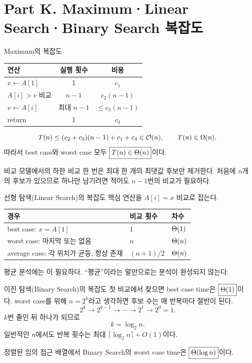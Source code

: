 \section{Part K. Maximum·Linear Search·Binary Search 복잡도}

\begin{frame}{Maximum의 복잡도}
  \renewcommand{\arraystretch}{.92}
  \begin{tabular}{@{}lcc@{}}
    \toprule
    연산 & 실행 횟수 & 비용 \\
    \midrule
    $v\gets A[1]$ & 1 & $c_1$ \\
    $A[i]>v$ 비교 & $n-1$ & $c_2(n-1)$ \\
    $v\gets A[i]$ & 최대 $n-1$ & $\le c_3(n-1)$ \\
    return & 1 & $c_4$ \\
    \bottomrule
  \end{tabular}
  \[
    T(n)\le(c_2+c_3)(n-1)+c_1+c_4\in\mathcal{O}(n),
    \qquad T(n)\in\Omega(n).
  \]
  따라서 best case와 worst case 모두 $\boxed{T(n)\in\Theta(n)}$이다.
  \begin{block}{비교 모델에서의 하한}
    비교 한 번은 최대 한 개의 최댓값 후보만 제거한다. 처음에 $n$개의 후보가 있으므로
    하나만 남기려면 적어도 $n-1$번의 비교가 필요하다.
  \end{block}
\end{frame}

\begin{frame}{선형 탐색(Linear Search)의 복잡도}
  핵심 연산을 $A[i]=x$ 비교로 잡는다.
  \begin{tabular}{@{}lll@{}}
    \toprule
    경우 & 비교 횟수 & 차수 \\
    \midrule
    best case: $x=A[1]$ & 1 & $\Theta(1)$ \\
    worst case: 마지막 또는 없음 & $n$ & $\Theta(n)$ \\
    average case: 각 위치가 균등, 항상 존재 & $(n+1)/2$ & $\Theta(n)$ \\
    \bottomrule
  \end{tabular}
  \vfill
  평균 분석에는 이 필요하다. ``평균''이라는 말만으로는 분석이 완성되지 않는다.
\end{frame}

\begin{frame}{이진 탐색(Binary Search)의 복잡도}
  첫 비교에서 찾으면 best case time은 $\boxed{\Theta(1)}$이다.
  worst case를 위해 $n=2^k$라고 생각하면 후보 수는 매 반복마다 절반이 된다.
  \[
    2^k \to 2^{k-1}\to\cdots\to2^1\to2^0=1.
  \]
  $k$번 줄인 뒤 하나가 되므로
  \[
    k=\log_2n.
  \]
  일반적인 $n$에서도 반복 횟수는 최대 $\lceil\log_2 n\rceil+O(1)$이다.
  \begin{takeaway}
    정렬된 임의 접근 배열에서 Binary Search의 worst case time은 $\boxed{\Theta(\log n)}$이다.
  \end{takeaway}
\end{frame}

